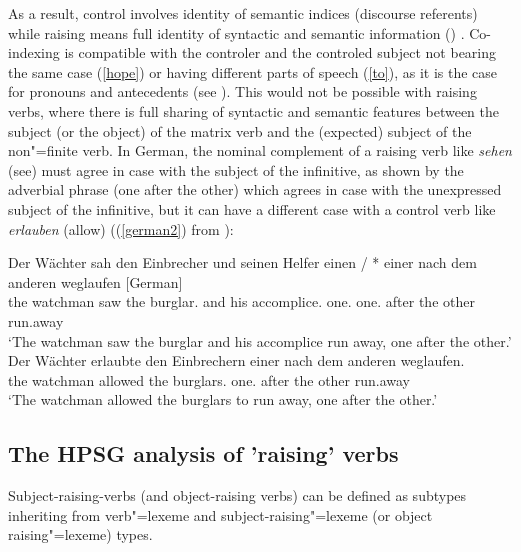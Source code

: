\documentclass[output=paper
	        ,collection
	        ,collectionchapter
 	        ,biblatex
                ,babelshorthands
                ,newtxmath
                ,draftmode
                ,colorlinks, citecolor=brown
]{langscibook}
\begin{document}
As a result, control involves identity of semantic indices (discourse referents) while raising means full identity of syntactic and semantic information () . Co-indexing is compatible with the controler and the controled subject not bearing the same case (\ref{hope}) or having different parts of speech (\ref{to}), as it is the case for pronouns and antecedents (see ). This would not be possible with raising verbs, where there is full sharing of syntactic and semantic features between the subject (or the object) of the matrix verb and the (expected) subject of the non"=finite verb. In German, the nominal complement of a raising verb like \emph{sehen} (see) must agree in case with the subject of the infinitive, as shown by the adverbial phrase (one after the other) which agrees in case with the unexpressed subject of the infinitive, but it can have a different case with a control verb like \emph{erlauben} (allow) ((\ref{german2}) from ):


\eal
\label{german2}
\ex 
\gll Der Wächter  sah den Einbrecher     und seinen Helfer            einen       / *  einer nach dem anderen weglaufen [German]\\
     the watchman saw the burglar.\ACC{} and his    accomplice.\ACC{} one.\ACC{} {} {} one.\NOM{} after the other run.away\\
\glt `The watchman saw the burglar and his accomplice run away, one after the other.'
\ex
\gll Der Wächter erlaubte den Einbrechern einer nach dem anderen weglaufen.\\
     the watchman  allowed the burglars.\DAT{} one.\NOM{} after the other run.away\\
\glt `The watchman allowed the burglars to run away, one after the other.'
\zl

\subsection{The HPSG analysis of 'raising' verbs}
Subject-raising-verbs (and object-raising verbs) can be defined as subtypes inheriting from verb"=lexeme and subject-raising"=lexeme (or object raising"=lexeme) types.
\end{document}
